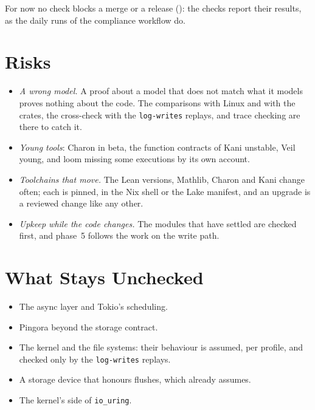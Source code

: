 For now no check blocks a merge or a release
(): the checks report their results, as
the daily runs of the compliance workflow do.

\section{Risks}
\label{app:verification-risks}

\begin{itemize}
  \item \emph{A wrong model.} A proof about a model that does not match what
    it models proves nothing about the code. The comparisons with Linux and
    with the crates, the cross-check with the \texttt{log-writes} replays, and
    trace checking are there to catch it.
  \item \emph{Young tools}: Charon in beta, the function contracts of Kani
    unstable, Veil young, and loom missing some executions by its own
    account.
  \item \emph{Toolchains that move.} The Lean versions, Mathlib, Charon and
    Kani change often; each is pinned, in the Nix shell or the Lake
    manifest, and an upgrade is a reviewed change like any other.
  \item \emph{Upkeep while the code changes.} The modules that have settled
    are checked first, and phase~5 follows the work on the write path.
\end{itemize}

\section{What Stays Unchecked}
\label{app:verification-unchecked}

\begin{itemize}
  \item The async layer and Tokio's scheduling.
  \item Pingora beyond the storage contract.
  \item The kernel and the file systems: their behaviour is assumed, per
    profile, and checked only by the \texttt{log-writes} replays.
  \item A storage device that honours flushes, which
     already assumes.
  \item The kernel's side of \texttt{io\_uring}.
\end{itemize}
